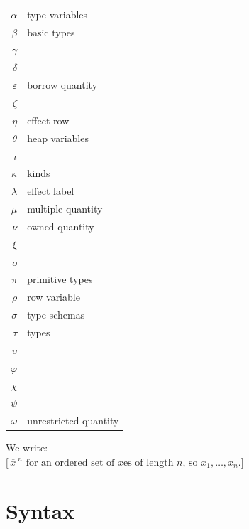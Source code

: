 \begin{longtable}[]{@{}rl@{}}
\toprule\noalign{}
\endhead
\bottomrule\noalign{}
\endlastfoot
\(\alpha\) & type variables \\
\(\beta\) & basic types \\
\(\gamma\) & \\
\(\delta\) & \\
\(\varepsilon\) & borrow quantity \\
\(\zeta\) & \\
\(\eta\) & effect row \\
\(\theta\) & heap variables \\
\(\iota\) & \\
\(\kappa\) & kinds \\
\(\lambda\) & effect label \\
\(\mu\) & multiple quantity \\
\(\nu\) & owned quantity \\
\(\xi\) & \\
\(ο\) & \\
\(\pi\) & primitive types \\
\(\rho\) & row variable \\
\(\sigma\) & type schemas \\
\(\tau\) & types \\
\(\upsilon\) & \\
\(\varphi\) & \\
\(\chi\) & \\
\(\psi\) & \\
\(\omega\) & unrestricted quantity \\
\end{longtable}

We write:\\
\(\lbrack{\overline{\, x\:}}^{n}\text{ for an }\text{ordered}\text{ set of }x\text{es of length }n\text{, so }{x_{1},\ldots,x_{n}}.\rbrack\)

\section{Syntax}

